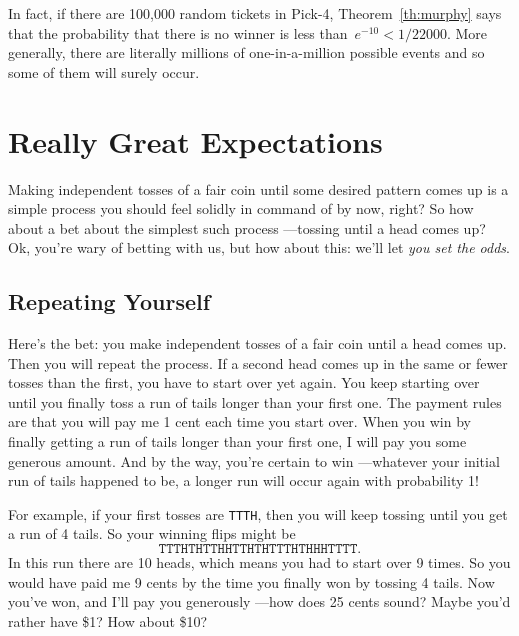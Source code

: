 In fact, if there are 100,000 random tickets in Pick-4,
Theorem~\ref{th:murphy} says that the probability that there is no
winner is less than~$e^{-10} < 1/22000$.  More generally, there are
literally millions of one-in-a-million possible events and so some of
them will surely occur.

\begin{problems}
\classproblems
{}

\homeworkproblems
{}

\end{problems}

\section{Really Great Expectations}\label{infinite_expect_sec}

Making independent tosses of a fair coin until some desired pattern
comes up is a simple process you should feel solidly in command of by
now, right?  So how about a bet about the simplest such process
---tossing until a head comes up?  Ok, you're wary of betting with us,
but how about this: we'll let \emph{you set the odds}.

\subsection{Repeating Yourself}\label{infinite_repeat_subsec}
Here's the bet: you make independent tosses of a fair coin until a
head comes up.  Then you will repeat the process.  If a second head
comes up in the same or fewer tosses than the first, you have to start
over yet again.  You keep starting over until you finally toss a run
of tails longer than your first one.  The payment rules are that you
will pay me 1 cent each time you start over.  When you win by finally
getting a run of tails longer than your first one, I will pay you some
generous amount.  And by the way, you're certain to win ---whatever
your initial run of tails happened to be, a longer run will occur
again with probability 1!

For example, if your first tosses are \texttt{TTTH}, then you will
keep tossing until you get a run of 4 tails.  So your winning
flips might be
\[
\texttt{TTTHTHTTHHTTHTHTTTHTHHHTTTT}.
\]
In this run there are 10 heads, which means you had to start over 9
times.  So you would have paid me 9 cents by the time you finally won
by tossing 4 tails.  Now you've won, and I'll pay you generously
---how does 25 cents sound?  Maybe you'd rather have \$1?  How about
\$10?

